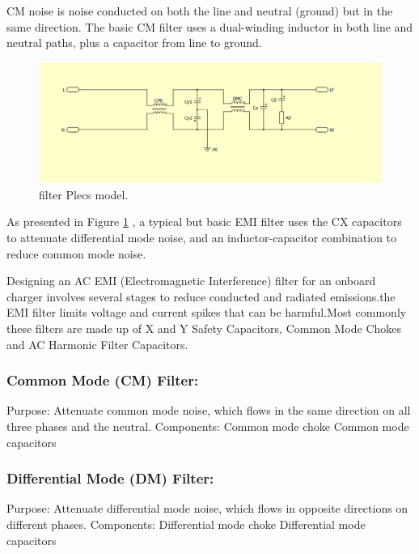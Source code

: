 \documentclass{article}
\begin{document}
CM noise is noise conducted on both the line and neutral (ground) but in the same direction. The basic CM filter uses a dual-winding inductor in both line and neutral paths, plus a capacitor from line to ground.
\begin{figure}[htbp]
    \centering
    \includegraphics[width=\textwidth]{modular_EMI Plecs model.png}
    \caption{filter Plecs model.}
    \label{fig:modular_EMI_Plecs_model}
\end{figure}
As presented in Figure \ref{fig:modular_EMI_Plecs_model} , a typical but basic EMI filter uses the CX capacitors to attenuate differential mode noise, and an inductor-capacitor combination to reduce common mode noise.

Designing an AC EMI (Electromagnetic Interference) filter for an onboard charger involves several stages to reduce conducted and radiated emissions.the EMI filter limits voltage and current spikes that can be harmful.Most commonly these filters are made up of X and Y Safety Capacitors, Common Mode Chokes and AC Harmonic Filter Capacitors.   
\subsubsection{Common Mode (CM) Filter:}
Purpose:
Attenuate common mode noise, which flows in the same direction on all three phases and the neutral.
Components:
Common mode choke
Common mode capacitors

\subsubsection{Differential Mode (DM) Filter:}
Purpose:
Attenuate differential mode noise, which flows in opposite directions on different phases.
Components:
Differential mode choke
Differential mode capacitors
\end{document}
